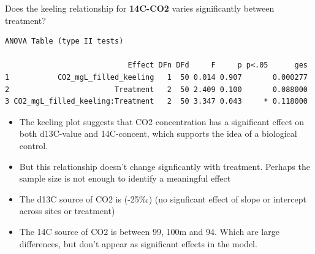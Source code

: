 \documentclass[
]{article}
\begin{document}
Does the keeling relationship for \textbf{14C-CO2} varies significantly
between treatment?

\begin{verbatim}
ANOVA Table (type II tests)

                            Effect DFn DFd     F     p p<.05      ges
1           CO2_mgL_filled_keeling   1  50 0.014 0.907       0.000277
2                        Treatment   2  50 2.409 0.100       0.088000
3 CO2_mgL_filled_keeling:Treatment   2  50 3.347 0.043     * 0.118000
\end{verbatim}

\begin{tcolorbox}[enhanced jigsaw, coltitle=black, opacitybacktitle=0.6, left=2mm, bottomtitle=1mm, colback=white, toprule=.15mm, arc=.35mm, toptitle=1mm, leftrule=.75mm, rightrule=.15mm, colbacktitle=quarto-callout-note-color!10!white, breakable, titlerule=0mm, bottomrule=.15mm, colframe=quarto-callout-note-color-frame, title=\textcolor{quarto-callout-note-color}{\faInfo}\hspace{0.5em}{Interpretation}, opacityback=0]

\begin{itemize}
\item
  The keeling plot suggests that CO2 concentration has a significant
  effect on both d13C-value and 14C-concent, which supports the idea of
  a biological control.
\item
  But this relationship doesn't change signficantly with treatment.
  Perhaps the sample size is not enough to identify a meaningful effect
\item
  The d13C source of CO2 is (-25‰) (no signficant effect of slope or
  intercept across sites or treatment)
\item
  The 14C source of CO2 is between 99, 100m and 94. Which are large
  differences, but don't appear as significant effects in the model.
\end{itemize}

\end{tcolorbox}
\end{document}

